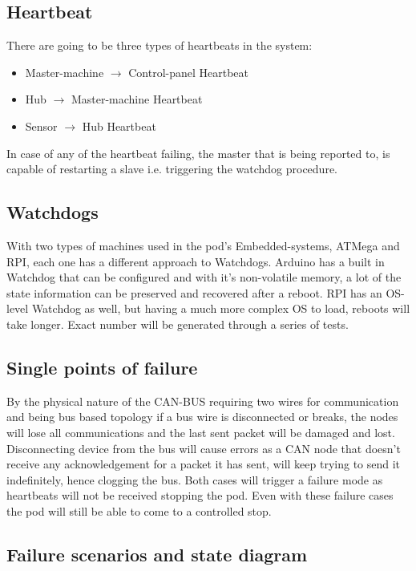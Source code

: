     \subsection{Heartbeat}
    There are going to be three types of heartbeats in the system:
    \begin{itemize}
      \item Master-machine $\rightarrow$ Control-panel Heartbeat
      \item Hub $\rightarrow$ Master-machine Heartbeat
      \item Sensor $\rightarrow$ Hub Heartbeat
    \end{itemize}
    
    In case of any of the heartbeat failing, the master that is being reported to, is capable of restarting a slave i.e. triggering the watchdog procedure.
    
	\subsection{Watchdogs}
    With two types of machines used in the pod's Embedded-systems, ATMega and RPI, each one has a different approach to Watchdogs. Arduino has a built in Watchdog that can be configured and with it's non-volatile memory, a lot of the state information can be preserved and recovered after a reboot. RPI has an OS-level Watchdog as well, but having a much more complex OS to load, reboots will take longer. Exact number will be generated through a series of tests.
   
    \subsection{Single points of failure}
    By the physical nature of the CAN-BUS requiring two wires for communication and being bus based topology if a bus wire is disconnected or breaks, the nodes will lose all communications and the last sent packet will be damaged and lost. Disconnecting device from the bus will cause errors as a CAN node that doesn't receive any acknowledgement for a packet it has sent, will keep trying to send it indefinitely, hence clogging the bus. Both cases will trigger a failure mode as heartbeats will not be received stopping the pod. Even with these failure cases the pod will still be able to come to a controlled stop. 
    
    \subsection {Failure scenarios and state diagram}
    
